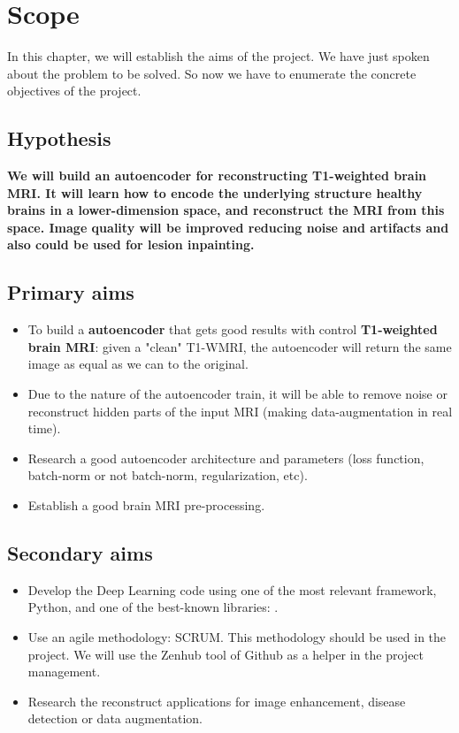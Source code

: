 \chapter{Scope}
\label{chapter:scope}

In this chapter, we will establish the aims of the project. We have just spoken about the problem to be solved. So now we have to enumerate the concrete objectives of the project. 

\section{Hypothesis}

\textbf{We will build an autoencoder for reconstructing T1-weighted brain MRI. It will learn how to encode the underlying structure healthy brains in a lower-dimension space, and reconstruct the MRI from this space. Image quality will be improved reducing noise and artifacts and also could be used for lesion inpainting.}

\section{Primary aims}

\begin{itemize}
    \item To build a \textbf{autoencoder} that gets good results with control \textbf{T1-weighted brain MRI}: given a "clean" T1-WMRI, the autoencoder will return the same image as equal as we can to the original.
    \item Due to the nature of the autoencoder train, it will be able to remove noise or reconstruct hidden parts of the input MRI (making data-augmentation in real time).
    \item Research a good autoencoder architecture and parameters (loss function, batch-norm or not batch-norm, regularization, etc).
    \item Establish a good brain MRI pre-processing.
\end{itemize}

\section{Secondary aims}

\begin{itemize}
    \item Develop the Deep Learning code using one of the most relevant framework, Python, and one of the best-known libraries:  .
    \item Use an agile methodology: SCRUM. This methodology should be used in the project. We will use the Zenhub tool of Github as a helper in the project management.
    \item Research the reconstruct applications for image enhancement, disease detection or data augmentation.
\end{itemize}

